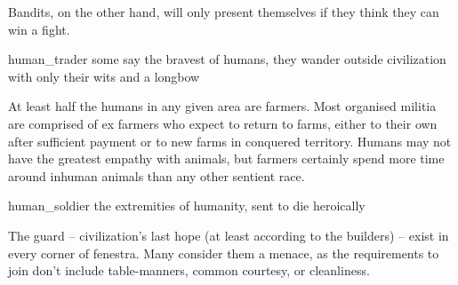 \begin{multicols}{2}
Bandits, on the other hand, will only present themselves if they think they can win a fight.

  {human_trader}%
  {some say the bravest of humans, they wander outside civilization with only their wits and a longbow}%

At least half the humans in any given area are farmers.
Most organised militia are comprised of ex farmers who expect to return to farms, either to their own after sufficient payment or to new farms in conquered territory.
Humans may not have the greatest empathy with animals, but farmers certainly spend more time around inhuman animals than any other sentient race.


  {human_soldier}%
  {the extremities of humanity, sent to die heroically}%

The \gls{guard} -- civilization's last hope (at least according to the builders) -- exist in every corner of \gls{fenestra}.
Many consider them a menace, as the requirements to join don't include table-manners, common courtesy, or cleanliness.


\end{multicols}

